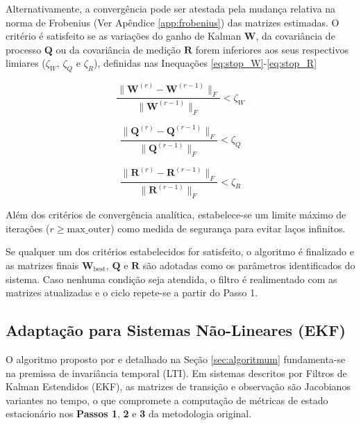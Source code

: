 \documentclass[journal]{IEEEtran}
\begin{document}
Alternativamente, a convergência pode ser atestada pela mudança relativa na norma de Frobenius (Ver Apêndice \ref{app:frobenius}) das matrizes estimadas. O critério é satisfeito se as variações do ganho de Kalman $\mathbf{W}$, da covariância de processo $\mathbf{Q}$ ou da covariância de medição $\mathbf{R}$ forem inferiores aos seus respectivos limiares ($\zeta_W$, $\zeta_Q$ e $\zeta_R$), definidas nas Inequações \eqref{eq:stop_W}-\eqref{eq:stop_R}

\begin{equation}
    \label{eq:stop_W}
    \frac{\|\mathbf{W}^{(r)} - \mathbf{W}^{(r-1)}\|_F}{\|\mathbf{W}^{(r-1)}\|_F} < \zeta_W
\end{equation}

\begin{equation}
    \label{eq:stop_Q}
    \frac{\|\mathbf{Q}^{(r)} - \mathbf{Q}^{(r-1)}\|_F}{\|\mathbf{Q}^{(r-1)}\|_F} < \zeta_Q
\end{equation}

\begin{equation}
    \label{eq:stop_R}
    \frac{\|\mathbf{R}^{(r)} - \mathbf{R}^{(r-1)}\|_F}{\|\mathbf{R}^{(r-1)}\|_F} < \zeta_R
\end{equation}

Além dos critérios de convergência analítica, estabelece-se um limite máximo de iterações ($r \ge \text{max\_outer}$) como medida de segurança para evitar laços infinitos. 

Se qualquer um dos critérios estabelecidos for satisfeito, o algoritmo é finalizado e as matrizes finais $\mathbf{W}_{\text{best}}$, $\mathbf{Q}$ e $\mathbf{R}$ são adotadas como os parâmetros identificados do sistema. Caso nenhuma condição seja atendida, o filtro é realimentado com as matrizes atualizadas e o ciclo repete-se a partir do Passo 1.

\subsection{Adaptação para Sistemas Não-Lineares (EKF)}
\label{sec:adapAlgorith}

O algoritmo proposto por \cite{zhang2020} e detalhado na Seção \ref{sec:algoritmum} fundamenta-se na premissa de invariância temporal (LTI). Em sistemas descritos por Filtros de Kalman Estendidos (EKF), as matrizes de transição e observação são Jacobianos variantes no tempo, o que compromete a computação de métricas de estado estacionário nos \textbf{Passos 1}, \textbf{2} e \textbf{3} da metodologia original.
\end{document}
